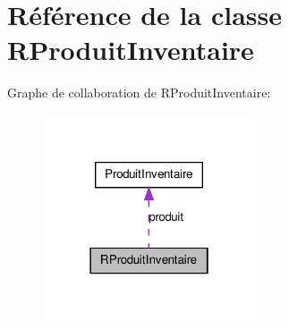 \hypertarget{class_r_produit_inventaire}{
\section{Référence de la classe RProduitInventaire}
\label{d8/dde/class_r_produit_inventaire}
}


Graphe de collaboration de RProduitInventaire:\nopagebreak
\begin{figure}[H]
\begin{center}
\leavevmode
\includegraphics[width=178pt]{d6/d1e/class_r_produit_inventaire__coll__graph}
\end{center}
\end{figure}
